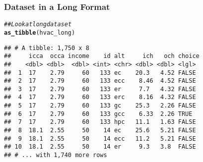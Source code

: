 \documentclass{beamer}\usepackage[]{graphicx}\usepackage[]{color}
\makeatletter
\newcommand{\hlnum}[1]{\textcolor[rgb]{0.686,0.059,0.569}{#1}}%
\newcommand{\hlstr}[1]{\textcolor[rgb]{0.192,0.494,0.8}{#1}}%
\newcommand{\hlcom}[1]{\textcolor[rgb]{0.678,0.584,0.686}{\textit{#1}}}%
\newcommand{\hlopt}[1]{\textcolor[rgb]{0,0,0}{#1}}%
\newcommand{\hlstd}[1]{\textcolor[rgb]{0.345,0.345,0.345}{#1}}%
\newcommand{\hlkwb}[1]{\textcolor[rgb]{0.69,0.353,0.396}{#1}}%
\newcommand{\hlkwc}[1]{\textcolor[rgb]{0.333,0.667,0.333}{#1}}%
\newcommand{\hlkwd}[1]{\textcolor[rgb]{0.737,0.353,0.396}{\textbf{#1}}}%
\newenvironment{kframe}{%
 \def\at@end@of@kframe{}%
 \ifinner\ifhmode%
  \def\at@end@of@kframe{\end{minipage}}%
  \begin{minipage}{\columnwidth}%
 \fi\fi%
 \def\FrameCommand##1{\hskip\@totalleftmargin \hskip-\fboxsep
 \colorbox{shadecolor}{##1}\hskip-\fboxsep
     \hskip-\linewidth \hskip-\@totalleftmargin \hskip\columnwidth}%
 \MakeFramed {\advance\hsize-\width
   \@totalleftmargin\z@ \linewidth\hsize
   \@setminipage}}%
 {\par\unskip\endMakeFramed%
 \at@end@of@kframe}
\newenvironment{knitrout}{}{} %
\makeatother
\begin{document}

\begin{frame}[fragile]\frametitle{Dataset in a Long Format}
\begin{knitrout}\footnotesize
{}\color{fgcolor}\begin{kframe}
\begin{alltt}
\hlcom{## Look at long dataset}
\hlkwd{as_tibble}\hlstd{(hvac_long)}
\end{alltt}
\begin{verbatim}
## # A tibble: 1,750 x 8
##     icca  occa income    id alt     ich   och choice
##    <dbl> <dbl>  <dbl> <int> <chr> <dbl> <dbl> <lgl> 
##  1  17    2.79     60   133 ec    20.3   4.52 FALSE 
##  2  17    2.79     60   133 ecc    8.46  4.52 FALSE 
##  3  17    2.79     60   133 er     7.7   4.32 FALSE 
##  4  17    2.79     60   133 erc    8.16  4.32 FALSE 
##  5  17    2.79     60   133 gc    25.3   2.26 FALSE 
##  6  17    2.79     60   133 gcc    6.33  2.26 TRUE  
##  7  17    2.79     60   133 hpc   11.1   1.63 FALSE 
##  8  18.1  2.55     50    14 ec    25.6   5.21 FALSE 
##  9  18.1  2.55     50    14 ecc   11.2   5.21 FALSE 
## 10  18.1  2.55     50    14 er     9.3   3.8  FALSE 
## # ... with 1,740 more rows
\end{verbatim}
\end{kframe}
\end{knitrout}
\end{frame}
\end{document}
